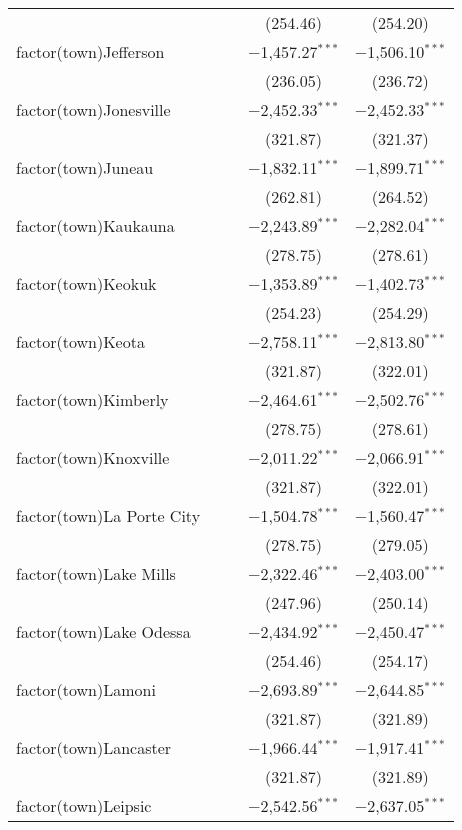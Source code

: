 \begin{table}[!htbp]
\begin{tabular}{@{\extracolsep{5pt}}lcccc}
  &  &  & (254.46) & (254.20) \\ 
  factor(town)Jefferson &  &  & $-$1,457.27$^{***}$ & $-$1,506.10$^{***}$ \\ 
  &  &  & (236.05) & (236.72) \\ 
  factor(town)Jonesville &  &  & $-$2,452.33$^{***}$ & $-$2,452.33$^{***}$ \\ 
  &  &  & (321.87) & (321.37) \\ 
  factor(town)Juneau &  &  & $-$1,832.11$^{***}$ & $-$1,899.71$^{***}$ \\ 
  &  &  & (262.81) & (264.52) \\ 
  factor(town)Kaukauna &  &  & $-$2,243.89$^{***}$ & $-$2,282.04$^{***}$ \\ 
  &  &  & (278.75) & (278.61) \\ 
  factor(town)Keokuk &  &  & $-$1,353.89$^{***}$ & $-$1,402.73$^{***}$ \\ 
  &  &  & (254.23) & (254.29) \\ 
  factor(town)Keota &  &  & $-$2,758.11$^{***}$ & $-$2,813.80$^{***}$ \\ 
  &  &  & (321.87) & (322.01) \\ 
  factor(town)Kimberly &  &  & $-$2,464.61$^{***}$ & $-$2,502.76$^{***}$ \\ 
  &  &  & (278.75) & (278.61) \\ 
  factor(town)Knoxville &  &  & $-$2,011.22$^{***}$ & $-$2,066.91$^{***}$ \\ 
  &  &  & (321.87) & (322.01) \\ 
  factor(town)La Porte City &  &  & $-$1,504.78$^{***}$ & $-$1,560.47$^{***}$ \\ 
  &  &  & (278.75) & (279.05) \\ 
  factor(town)Lake Mills &  &  & $-$2,322.46$^{***}$ & $-$2,403.00$^{***}$ \\ 
  &  &  & (247.96) & (250.14) \\ 
  factor(town)Lake Odessa &  &  & $-$2,434.92$^{***}$ & $-$2,450.47$^{***}$ \\ 
  &  &  & (254.46) & (254.17) \\ 
  factor(town)Lamoni &  &  & $-$2,693.89$^{***}$ & $-$2,644.85$^{***}$ \\ 
  &  &  & (321.87) & (321.89) \\ 
  factor(town)Lancaster &  &  & $-$1,966.44$^{***}$ & $-$1,917.41$^{***}$ \\ 
  &  &  & (321.87) & (321.89) \\ 
  factor(town)Leipsic &  &  & $-$2,542.56$^{***}$ & $-$2,637.05$^{***}$ \\ 

\end{tabular}
\end{table}
